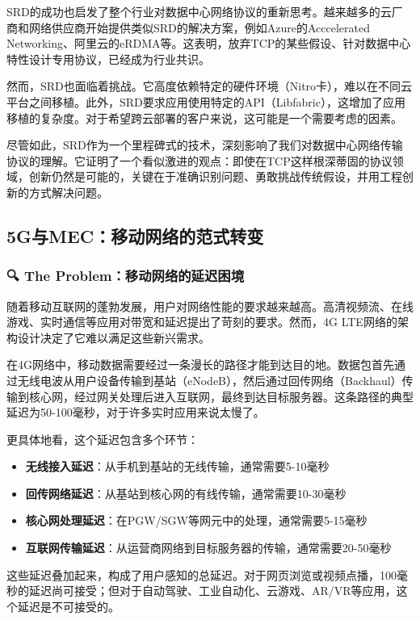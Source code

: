 SRD的成功也启发了整个行业对数据中心网络协议的重新思考。越来越多的云厂商和网络供应商开始提供类似SRD的解决方案，例如Azure的Acccelerated Networking、阿里云的eRDMA等。这表明，放弃TCP的某些假设、针对数据中心特性设计专用协议，已经成为行业共识。

然而，SRD也面临着挑战。它高度依赖特定的硬件环境（Nitro卡），难以在不同云平台之间移植。此外，SRD要求应用使用特定的API（Libfabric），这增加了应用移植的复杂度。对于希望跨云部署的客户来说，这可能是一个需要考虑的因素。

尽管如此，SRD作为一个里程碑式的技术，深刻影响了我们对数据中心网络传输协议的理解。它证明了一个看似激进的观点：即使在TCP这样根深蒂固的协议领域，创新仍然是可能的，关键在于准确识别问题、勇敢挑战传统假设，并用工程创新的方式解决问题。

\subsection{5G与MEC：移动网络的范式转变}

\subsubsection{🔍 The Problem：移动网络的延迟困境}

随着移动互联网的蓬勃发展，用户对网络性能的要求越来越高。高清视频流、在线游戏、实时通信等应用对带宽和延迟提出了苛刻的要求。然而，4G LTE网络的架构设计决定了它难以满足这些新兴需求。

在4G网络中，移动数据需要经过一条漫长的路径才能到达目的地。数据包首先通过无线电波从用户设备传输到基站（eNodeB），然后通过回传网络（Backhaul）传输到核心网，经过网关处理后进入互联网，最终到达目标服务器。这条路径的典型延迟为50-100毫秒，对于许多实时应用来说太慢了。

更具体地看，这个延迟包含多个环节：

\begin{itemize}
    \item \textbf{无线接入延迟}：从手机到基站的无线传输，通常需要5-10毫秒
    \item \textbf{回传网络延迟}：从基站到核心网的有线传输，通常需要10-30毫秒
    \item \textbf{核心网处理延迟}：在PGW/SGW等网元中的处理，通常需要5-15毫秒
    \item \textbf{互联网传输延迟}：从运营商网络到目标服务器的传输，通常需要20-50毫秒
\end{itemize}

这些延迟叠加起来，构成了用户感知的总延迟。对于网页浏览或视频点播，100毫秒的延迟尚可接受；但对于自动驾驶、工业自动化、云游戏、AR/VR等应用，这个延迟是不可接受的。

